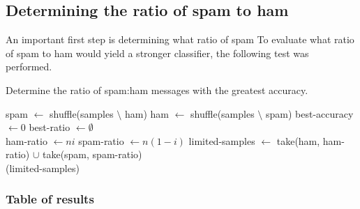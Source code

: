 \documentclass[10pt]{article}
\begin{document}
\subsection{Determining the ratio of spam to ham}
An important first step is determining what ratio of spam
To evaluate what ratio of spam to ham would yield a stronger classifier, the
following test was performed.

\begin{algorithm}
  \caption{Determine the ratio of spam:ham messages with the greatest accuracy.}
  \begin{algorithmic}
  \State spam $\gets$ {\sc shuffle}(samples $\setminus $ ham)
  \State ham $\gets$ {\sc shuffle}(samples $\setminus $ spam)
  \State best-accuracy $\gets 0$
  \State best-ratio $\gets \emptyset$
  \\

  \State ham-ratio $\gets ni$
  \State spam-ratio $\gets n(1 - i)$
  \State limited-samples $\gets$ {\sc take}(ham, ham-ratio) $\cup$ {\sc take}(spam, spam-ratio)
  \\

  (limited-samples)

  \EndIf
  \EndFor
  \State {}
    \EndFunction
  \end{algorithmic}\label{algo}
\end{algorithm}
\subsubsection{Table of results}
\label{sec-2-2-1}
\end{document}
